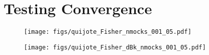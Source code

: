 \documentclass[12pt, letterpaper, preprint]{aastex62}
\begin{document}
\section{Testing Convergence} 
\begin{figure}
\begin{center}
    \texttt{[image: figs/quijote\_Fisher\_nmocks\_001\_05.pdf]}
    \caption{}
\label{fig:cov_converge}
\end{center}
\end{figure}

\begin{figure}
\begin{center}
    \texttt{[image: figs/quijote\_Fisher\_dBk\_nmocks\_001\_05.pdf]} 
    \caption{}
\label{fig:dbk_converge}
\end{center}
\end{figure}


 
\end{document}
